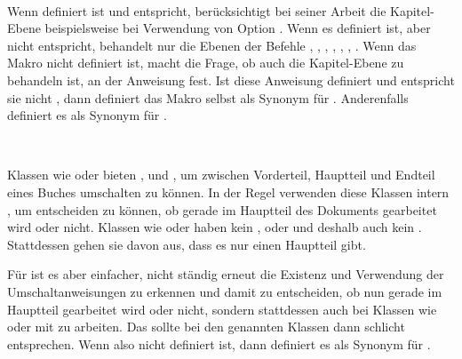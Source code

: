 \begin{Declaration}
  \ \ %
  \ \ 
\end{Declaration}
Wenn  definiert ist und 
entspricht, berücksichtigt  bei seiner Arbeit die
Kapitel-Ebene beispielsweise bei Verwendung von Option
. Wenn es definiert ist, aber nicht
 entspricht, behandelt  nur die Ebenen der
Befehle , ,
, ,
, ,
. Wenn das Makro nicht definiert ist, macht
 die Frage, ob auch die Kapitel-Ebene zu behandeln ist, an
der Anweisung  fest. Ist diese Anweisung
definiert und entspricht sie nicht , dann definiert
 das Makro  selbst als Synonym für
. Anderenfalls definiert es  als Synonym für
.%
%
\EndIndexGroup


\begin{Declaration}
  \ \ %
  \ \ 
\end{Declaration}
Klassen wie  oder  bieten
,
 und
, um zwischen Vorderteil,
Hauptteil und Endteil eines Buches umschalten zu können. In der Regel
verwenden diese Klassen intern , um entscheiden zu
können, ob gerade im Hauptteil des Dokuments gearbeitet wird oder
nicht. Klassen wie  oder  haben kein
,  oder
 und deshalb auch kein
. Stattdessen gehen sie davon aus, dass es nur einen
Hauptteil gibt.

Für  ist es aber einfacher, nicht ständig erneut die
Existenz und Verwendung der Umschaltanweisungen zu erkennen und damit zu
entscheiden, ob nun gerade im Hauptteil gearbeitet wird oder nicht, sondern
stattdessen auch bei Klassen wie  oder  mit
 zu arbeiten. Das sollte bei den genannten Klassen dann
schlicht  entsprechen. Wenn also
 nicht definiert ist, dann definiert 
es als Synonym für .

